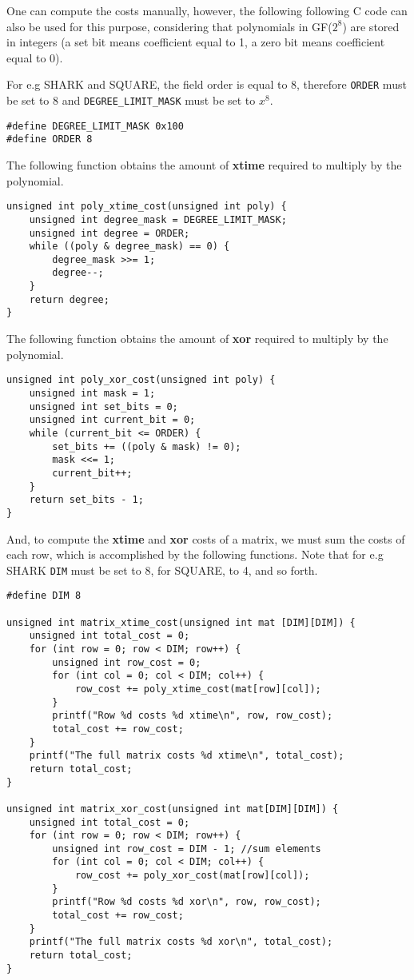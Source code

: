 One can compute the costs manually, however, the following following C code can also be used for this purpose, considering that polynomials in GF($2^8$) are stored in integers (a set bit means coefficient equal to 1, a zero bit means coefficient equal to 0).

For e.g SHARK and SQUARE, the field order is equal to 8, therefore \texttt{ORDER} must be set to 8 and \texttt{DEGREE_LIMIT_MASK} must be set to $x^8$.

\begin{verbatim}
#define DEGREE_LIMIT_MASK 0x100
#define ORDER 8
\end{verbatim}

The following function obtains the amount of \textbf{xtime} required to multiply by the polynomial.

\begin{verbatim}
unsigned int poly_xtime_cost(unsigned int poly) {
	unsigned int degree_mask = DEGREE_LIMIT_MASK;
	unsigned int degree = ORDER;
	while ((poly & degree_mask) == 0) {
		degree_mask >>= 1;
		degree--;
	}
	return degree;
}
\end{verbatim}

The following function obtains the amount of \textbf{xor} required to multiply by the polynomial.
\begin{verbatim}
unsigned int poly_xor_cost(unsigned int poly) {
	unsigned int mask = 1;
	unsigned int set_bits = 0;
	unsigned int current_bit = 0;
	while (current_bit <= ORDER) {
		set_bits += ((poly & mask) != 0);
		mask <<= 1;
		current_bit++;
	}
	return set_bits - 1;
}
\end{verbatim}

And, to compute the \textbf{xtime} and \textbf{xor} costs of a matrix, we must sum the costs of each row, which is accomplished by the following functions. Note that for e.g SHARK \texttt{DIM} must be set to 8, for SQUARE, to 4, and so forth.

\begin{verbatim}
#define DIM 8

unsigned int matrix_xtime_cost(unsigned int mat [DIM][DIM]) {
	unsigned int total_cost = 0;
	for (int row = 0; row < DIM; row++) {
		unsigned int row_cost = 0;
		for (int col = 0; col < DIM; col++) {
			row_cost += poly_xtime_cost(mat[row][col]);
		}
		printf("Row %d costs %d xtime\n", row, row_cost);
		total_cost += row_cost;
	}
	printf("The full matrix costs %d xtime\n", total_cost);
	return total_cost;
}

unsigned int matrix_xor_cost(unsigned int mat[DIM][DIM]) {
	unsigned int total_cost = 0;
	for (int row = 0; row < DIM; row++) {
		unsigned int row_cost = DIM - 1; //sum elements
		for (int col = 0; col < DIM; col++) {
			row_cost += poly_xor_cost(mat[row][col]);
		}
		printf("Row %d costs %d xor\n", row, row_cost);
		total_cost += row_cost;
	}
	printf("The full matrix costs %d xor\n", total_cost);
	return total_cost;
}
\end{verbatim}

